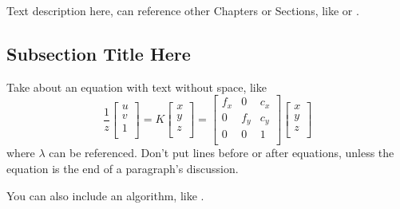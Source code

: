 
Text description here, can reference other Chapters or Sections, like  or .

\subsection[Optional TOC Subsection Title Here]{Subsection Title Here}
\label{sec:subsectionRefNameHere}

Take about an equation with text without space, like
\begin{equation}
\label{eq:eqRefNameHere}
\frac{1}{z}
\begin{bmatrix}
u \\
v \\
1 \\
\end{bmatrix}=
K \begin{bmatrix}
x \\
y \\
z \\
\end{bmatrix}=
\begin{bmatrix}
f_x & 0 & c_x \\
0 & f_y & c_y \\
0 & 0 & 1 \\
\end{bmatrix}
\begin{bmatrix}
x \\
y \\
z \\
\end{bmatrix}
\end{equation}
where $\lambda$ can be referenced. Don't put lines before or after equations, unless the equation is the end of a paragraph's discussion. 

You can also include an algorithm, like . 

